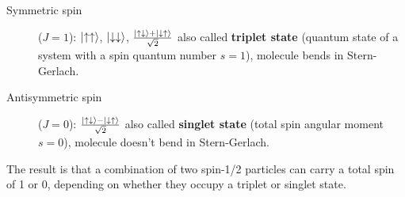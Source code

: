 \begin{description}
   \item[Symmetric spin] ($J=1$): $\ket{\uparrow\uparrow}$, $\ket{\downarrow\downarrow}$, $\frac{\ket{\uparrow\downarrow}+\ket{\downarrow\uparrow}}{\sqrt{2}}$ also called \textbf{triplet state} (quantum state of a system with a spin quantum number $s=1$), molecule bends in Stern-Gerlach.\\
   \item[Antisymmetric spin] ($J=0$): $\frac{\ket{\uparrow\downarrow}-\ket{\downarrow\uparrow}}{\sqrt{2}}$ also called \textbf{singlet state} (total spin angular moment $s=0$), molecule doesn't bend in Stern-Gerlach.\\
\end{description}

The result is that a combination of two spin-1/2 particles can carry a total spin of 1 or 0, depending on whether they occupy a triplet or singlet state.\\

